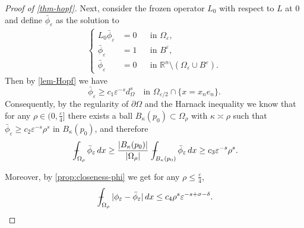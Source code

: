 \documentclass[11pt,reqno]{amsart}
\theoremstyle{plain}
\theoremstyle{definition}
\numberwithin{equation}{section}
\newcommand{\R}{\mathbb{R}}
\newcommand{\eps}{\varepsilon}
\newcommand{\1}{\mathbbm{1}}
\renewcommand{\d}{\textnormal{\,d}}
\newcommand{\average}{{\mathchoice {\kern1ex\vcenter{\hrule height.4pt
width 6pt depth0pt} \kern-9.7pt} {\kern1ex\vcenter{\hrule
height.4pt width 4.3pt depth0pt} \kern-7pt} {} {} }}
\newcommand{\dashint}{\average\int}
\begin{document}
\begin{proof}[Proof of \autoref{thm-hopf}]
Next, consider the frozen operator $L_0$ with respect to $L$ at 0 and define $\bar{\phi}_{\eps}$ as the solution to
\begin{align*}
\left\{
\begin{aligned}
L_0 \bar{\phi}_{\eps} &= 0 &&\text{in }\Omega_{\eps}, \\
\bar{\phi}_{\eps} &=1 &&\text{in }B^\varepsilon, \\
\bar{\phi}_{\eps} &=0 &&\text{in }\R^n \setminus (\Omega_\varepsilon \cup B^\varepsilon).
\end{aligned}
\right.
\end{align*}
Then by \autoref{lem-Hopf} we have 
\begin{equation*}
\bar{\phi}_{\eps} \geq c_1 \eps^{-s} d_{\Omega}^s \quad\text{in }\Omega_{\eps/2} \cap \{ x = x_n e_n \}.
\end{equation*}
Consequently, by the regularity of $\partial \Omega$ and the Harnack inequality we know that for any $\rho \in (0,\frac{\eps}{4}]$ there exists a ball $B_{\kappa}(p_0) \subset \Omega_{\rho}$ with $\kappa \asymp \rho$ such that $\bar{\phi}_{\eps} \ge c_2 \eps^{-s} \rho^s$ in $B_{\kappa}(p_0)$, and therefore
\begin{align}
    \label{eq-hopf-T}
    \dashint_{\Omega_{\rho}} \bar{\phi}_{\eps} \d x \ge \frac{|B_{\kappa}(p_0)|}{|\Omega_{\rho}|} \dashint_{B_{\kappa}(p_0)} \bar{\phi}_{\eps} \d x \ge c_3 \eps^{-s} \rho^s.
\end{align}



Moreover, by \autoref{prop:closeness-phi} we get for any $\rho \le \frac{\varepsilon}{4}$, 
\begin{align}
\label{eq-phi-Cs}
    \dashint_{\Omega_{\rho}} |\phi_{\eps} - \bar{\phi}_{\eps}| \d x \le c_4 \rho^{s} \eps^{-s + \sigma - \delta}.
\end{align}


\end{proof}
\end{document}
